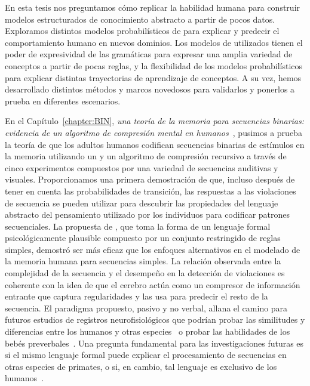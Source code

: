 
En esta tesis nos preguntamos cómo replicar la habilidad humana para construir modelos estructurados de conocimiento abstracto a partir de pocos datos. Exploramos distintos modelos probabilísticos de \lot para explicar y predecir el comportamiento humano en nuevos dominios. Los modelos de \lot utilizados tienen el poder de expresividad de las gramáticas para expresar una amplia variedad de conceptos a partir de pocas reglas, y la flexibilidad de los modelos probabilísticos para explicar distintas trayectorias de aprendizaje de conceptos. A su vez, hemos desarrollado distintos métodos y marcos novedosos para validarlos y ponerlos a prueba en diferentes escenarios.

En el Capítulo~\ref{chapter:BIN}, \textit{una teoría de la memoria para secuencias binarias: evidencia de un algoritmo de compresión mental en humanos~\cite{planton2021memory}}, pusimos a prueba la teoría de que los adultos humanos codifican secuencias binarias de estímulos en la memoria utilizando un \lot y un algoritmo de compresión recursivo a través de cinco experimentos compuestos por una variedad de secuencias auditivas y visuales. Proporcionamos una primera demostración de que, incluso después de tener en cuenta las probabilidades de transición, las respuestas a las violaciones de secuencia se pueden utilizar para descubrir las propiedades del lenguaje abstracto del pensamiento utilizado por los individuos para codificar patrones secuenciales. La propuesta de \grambin, que toma la forma de un lenguaje formal psicológicamente plausible compuesto por un conjunto restringido de reglas simples, demostró ser más eficaz que los enfoques alternativos en el modelado de la memoria humana para secuencias simples. La relación observada entre la complejidad \mdlbin de la secuencia y el desempeño en la detección de violaciones es coherente con la idea de que el cerebro actúa como un compresor de información entrante que captura regularidades y las usa para predecir el resto de la secuencia. El paradigma propuesto, pasivo y no verbal, allana el camino para futuros estudios de registros neurofisiológicos que podrían probar las similitudes y diferencias entre los humanos y otras especies~\cite{f13} o probar las habilidades de los bebés preverbales~\cite{f70}. Una pregunta fundamental para las investigaciones futuras es si el mismo lenguaje formal puede explicar el procesamiento de secuencias en otras especies de primates, o si, en cambio, tal lenguaje es exclusivo de los humanos~\cite{f6}.

